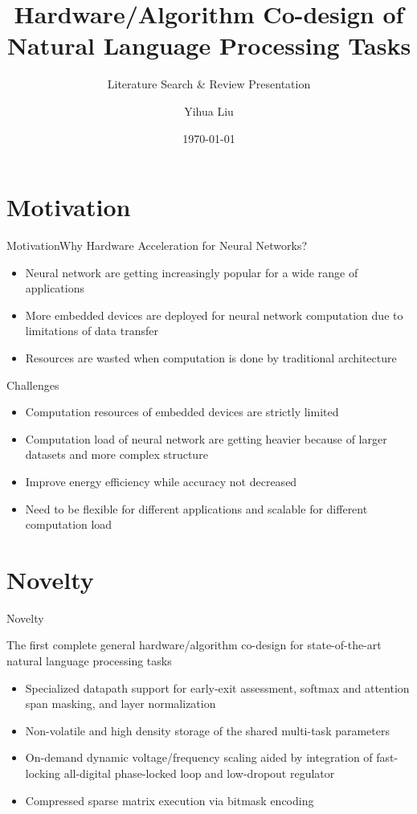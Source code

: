 \documentclass[12pt]{beamer}
\begin{document}
\title{Hardware/Algorithm Co-design of Natural Language Processing Tasks}
\subtitle{Literature Search \& Review Presentation}
\author{Yihua Liu}
\date{\today}
\begin{frame}
    \titlepage
\end{frame}
\section{Motivation}
\begin{frame}{Motivation}{Why Hardware Acceleration for Neural Networks?}
    \begin{itemize}
        \item Neural network are getting increasingly popular for a wide range of applications
        \item More embedded devices are deployed for neural network computation due to limitations of data transfer
        \item Resources are wasted when computation is done by traditional architecture
    \end{itemize}
    \begin{block}{Challenges}
    \begin{itemize}
        \item Computation resources of embedded devices are strictly limited
        \item Computation load of neural network are getting heavier because of larger datasets and more complex structure
        \item Improve energy efficiency while accuracy not decreased
        \item Need to be flexible for different applications and scalable for different computation load
    \end{itemize}
    \end{block}
\end{frame}
\section{Novelty}
\begin{frame}{Novelty}
    \begin{center}
        The first complete general hardware/algorithm co-design for state-of-the-art natural language processing tasks
    \end{center}
    \begin{itemize}
        \item Specialized datapath support for early-exit assessment, softmax and attention span masking, and layer normalization
        \item Non-volatile and high density storage of the shared multi-task parameters
        \item On-demand dynamic voltage/frequency scaling aided by integration of fast-locking all-digital phase-locked loop and low-dropout regulator
        \item Compressed sparse matrix execution via bitmask encoding \cite{tambe2021edgebert}
    \end{itemize}
\end{frame}
\end{document}
